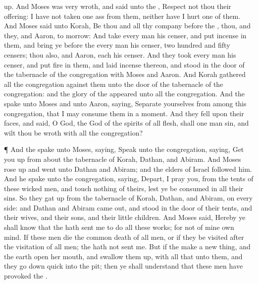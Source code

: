 {up.
And
Moses was
very
wroth, and
said unto the
{},
Respect not thou their
offering: I have not
taken
one
ass from them, neither have I
hurt
one of them.
And
Moses
said unto
Korah, Be thou and all thy
company
before the
{}, thou, and they, and
Aaron, to
morrow:
And
take every
man his
censer, and
put
incense in them, and
bring ye
before the
{} every
man his
censer, two
hundred and
fifty
censers; thou also, and
Aaron,
each
{} his
censer.
And they
took every
man his
censer, and
put
fire in them, and
laid
incense thereon, and
stood in the
door of the
tabernacle of the
congregation with
Moses and
Aaron.
And
Korah
gathered all the
congregation against them unto the
door of the
tabernacle of the
congregation: and the
glory of the
{}
appeared unto all the
congregation.
And the
{}
spake unto
Moses and unto
Aaron,
saying,
Separate yourselves from
among this
congregation, that I may
consume them in a
moment.
And they
fell upon their
faces, and
said, O
God, the
God of the
spirits of all
flesh, shall
one
man
sin, and wilt thou be
wroth with all the
congregation?
\par }{\PP {}¶ And the
{}
spake unto
Moses,
saying,
Speak unto the
congregation,
saying, Get you
up from
about the
tabernacle of
Korah,
Dathan, and
Abiram.
And
Moses rose
up and
went unto
Dathan and
Abiram; and the
elders of
Israel
followed
him.
And he
spake unto the
congregation,
saying,
Depart, I pray you, from the
tents of these
wicked
men, and
touch nothing of theirs, lest ye be
consumed in all their
sins.
So they gat
up from the
tabernacle of
Korah,
Dathan, and
Abiram, on every
side: and
Dathan and
Abiram came
out, and
stood in the
door of their
tents, and their
wives, and their
sons, and their little
children.
And
Moses
said, Hereby ye shall
know that the
{} hath
sent me to
do all these
works; for
{} not
{} of mine own
mind.
If these men
die the common
death of all
men, or if they be
visited after the
visitation of all
men;
{} the
{} hath not
sent me.
But if the
{}
make a new
thing, and the
earth
open her
mouth, and swallow them
up, with all that
{} unto them, and they go
down
quick into the
pit; then ye shall
understand that these
men have
provoked the
{}.
}
